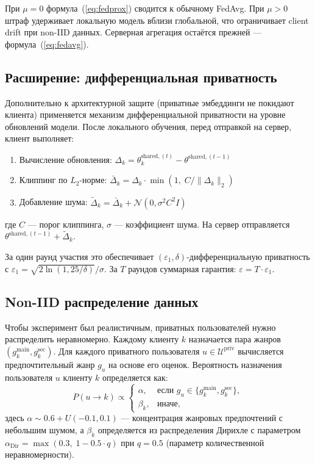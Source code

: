 \documentclass[14pt,a4paper]{extarticle}
\begin{document}
При $\mu = 0$ формула~(\ref{eq:fedprox}) сводится к обычному FedAvg. При $\mu > 0$ штраф удерживает локальную модель вблизи глобальной, что ограничивает client drift при non-IID данных. Серверная агрегация остаётся прежней --- формула~(\ref{eq:fedavg}).


\subsection{Расширение: дифференциальная приватность}

Дополнительно к архитектурной защите (приватные эмбеддинги не покидают клиента) применяется механизм дифференциальной приватности на уровне обновлений модели. После локального обучения, перед отправкой на сервер, клиент выполняет:
\begin{enumerate}
  \item Вычисление обновления: $\Delta_k = \theta_k^{\text{shared},(t)} - \theta^{\text{shared},(t-1)}$
  \item Клиппинг по $L_2$-норме: $\bar{\Delta}_k = \Delta_k \cdot \min\!\left(1,\; C / \|\Delta_k\|_2\right)$
  \item Добавление шума: $\tilde{\Delta}_k = \bar{\Delta}_k + \mathcal{N}(0, \sigma^2 C^2 I)$
\end{enumerate}
где $C$ --- порог клиппинга, $\sigma$ --- коэффициент шума. На сервер отправляется $\theta^{\text{shared},(t-1)} + \tilde{\Delta}_k$.

За один раунд участия это обеспечивает $(\varepsilon_1, \delta)$-дифференциальную приватность с $\varepsilon_1 = \sqrt{2 \ln(1{,}25/\delta)}/\sigma$. За $T$ раундов суммарная гарантия: $\varepsilon = T \cdot \varepsilon_1$.


\subsection{Non-IID распределение данных}

Чтобы эксперимент был реалистичным, приватных пользователей нужно распределить неравномерно. Каждому клиенту $k$ назначается пара жанров $(g_k^{\text{main}}, g_k^{\text{sec}})$. Для каждого приватного пользователя $u \in \mathcal{U}^{\text{priv}}$ вычисляется предпочтительный жанр $g_u$ на основе его оценок. Вероятность назначения пользователя $u$ клиенту $k$ определяется как:
\begin{equation}
P(u \to k) \propto \begin{cases}
\alpha, & \text{если } g_u \in \{g_k^{\text{main}}, g_k^{\text{sec}}\}, \\
\beta_k, & \text{иначе},
\end{cases}
\end{equation}
здесь $\alpha \sim 0.6 + U(-0.1, 0.1)$ --- концентрация жанровых предпочтений с небольшим шумом, а $\beta_k$ определяется из распределения Дирихле с параметром $\alpha_{\text{Dir}} = \max(0.3,\; 1 - 0.5 \cdot q)$ при $q = 0.5$ (параметр количественной неравномерности).
\end{document}
